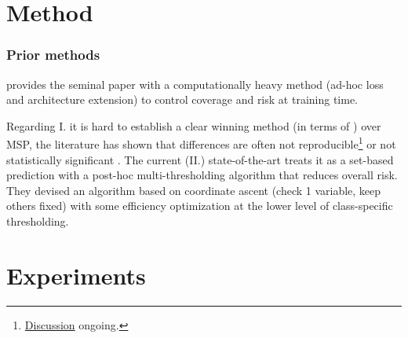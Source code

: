 \section{Method}\label{sec:method}

\subsubsection{Prior methods}

\cite{geifman2017selective,geifman2018bias} provides the seminal paper with a computationally heavy method (ad-hoc loss and architecture extension) to control coverage and risk at training time.

Regarding I. it is hard to establish a clear winning method (in terms of \AURC) over MSP, the literature has shown that differences are often not reproducible\footnote{\href{https://github.com/LayneH/SAT-selective-cls/issues/3\#issuecomment-1640151933}{Discussion} ongoing.} or not statistically significant \cite{jaeger2023a}.
The current (II.) state-of-the-art \cite{lin2022scrib} treats it as a set-based prediction with a post-hoc multi-thresholding algorithm that reduces overall risk. They devised an algorithm based on coordinate ascent (check 1 variable, keep others fixed) with some efficiency optimization at the lower level of class-specific thresholding. 









\section{Experiments}


